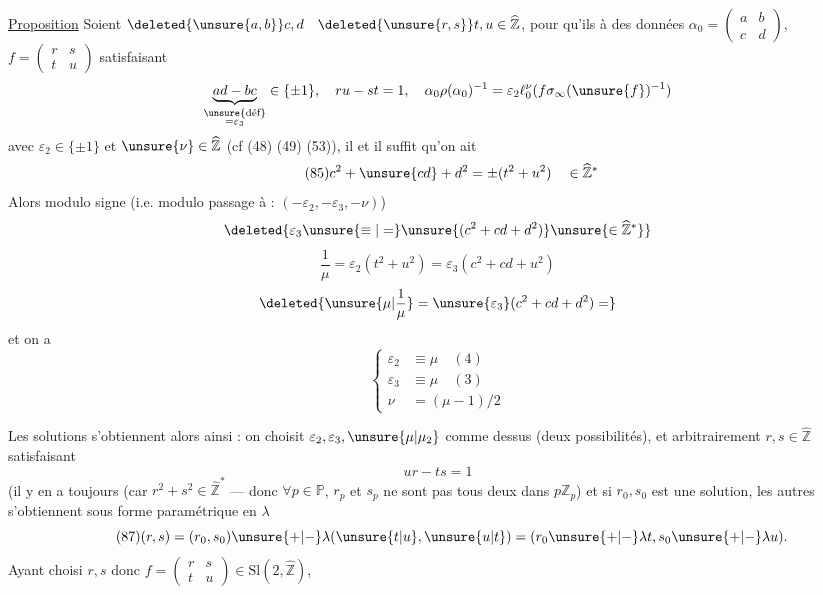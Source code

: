 \uline{Proposition} Soient $\deleted{\unsure{a,b}}c,d\quad\deleted{\unsure{r,s}}t,u\in\widehat{\mathbb Z}$,
pour qu'ils  à des données
$\alpha_0=\begin{pmatrix}a&b\\c&d\end{pmatrix}$,
$f=\begin{pmatrix}r&s\\t&u\end{pmatrix}$ satisfaisant
\[
\underbrace{ad-bc}_{\substack{\unsure{\text{déf}}\\=\varepsilon_3}}\in\{\pm1\},
\quad ru-st=1,
\quad\alpha_0\rho(\alpha_0)^{-1}=\varepsilon_2\ell_0^{\nu}(f\sigma_\infty(\unsure{f})^{-1})
\]
avec $\varepsilon_2\in\{\pm1\}$ et $\unsure{\nu}\in\widehat{\mathbb Z}$
 (cf (48) (49) (53)),
il  et  il suffit qu'on ait
\[
\tag{85}
c^2+\unsure{cd}+d^2=\pm(t^2+u^2)\quad\in\widehat{\mathbb Z}^*
\]
Alors 
modulo signe (i.e. modulo passage à : $(-\varepsilon_2,-\varepsilon_3,-\nu)$)
\[
\deleted{\varepsilon_3\unsure{\equiv|=}\unsure{(c^2+cd+d^2)}\unsure{\in\widehat{\mathbb Z}^*}}
\]
\[
\tag{86}
\frac1\mu=\varepsilon_2(t^2+u^2)=\varepsilon_3(c^2+cd+u^2)
\]
\[
\deleted{\unsure{\mu|\frac1\mu}=\unsure{\varepsilon_3}(c^2+cd+d^2)=}
\]
et on a
\[
\tag{87}
\left\{\begin{aligned}
\varepsilon_2&\equiv\mu\quad(4)\\
\varepsilon_3&\equiv\mu\quad(3)\\
\nu&=(\mu-1)/2
\end{aligned}\right.
\]



Les solutions s'obtiennent alors ainsi : on choisit
$\varepsilon_2,\varepsilon_3,\unsure{\mu|\mu_2}$ comme dessus (deux possibilités),  et arbitrairement $r,s\in\widehat{\mathbb Z}$ satisfaisant
\[
ur-ts=1
\]
(il y en a toujours (car $r^2+s^2\in\widehat{\mathbb Z}^*$ --- donc
$\forall p\in\mathbb P$, $r_p$ et $s_p$ ne sont pas tous deux dans $p\mathbb Z_p$)
et si $r_0,s_0$ est une solution, les autres s'obtiennent sous forme paramétrique en $\lambda$
\[
\tag{87}
(r,s)=(r_0,s_0)\unsure{+|-}\lambda(\unsure{t|u},\unsure{u|t})
=(r_0\unsure{+|-}\lambda t,s_0\unsure{+|-}\lambda u).
\]
Ayant choisi $r,s$ donc $f=\begin{pmatrix}r&s\\t&u\end{pmatrix}\in\mathrm{Sl}(2,\widehat{\mathbb Z})$,

